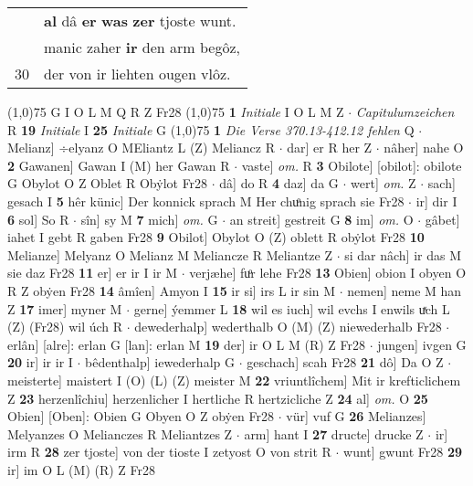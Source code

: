 \documentclass[8pt,a4paper,notitlepage]{article}
\begin{document}
\begin{table}[ht]
\begin{minipage}[t]{0.5\linewidth}
\begin{tabular}{rl}
 & \textbf{al} dâ \textbf{er} \textbf{was} \textbf{ze}\textbf{r} tjoste wunt.\\ 
 & manic zaher \textbf{ir} den arm begôz,\\ 
30 & der von ir liehten ougen vlôz.\\ 
\end{tabular}
\scriptsize
\line(1,0){75} \newline
G I O L M Q R Z Fr28 \newline
\line(1,0){75} \newline
\textbf{1} \textit{Initiale} I O L M Z   $\cdot$ \textit{Capitulumzeichen} R  \textbf{19} \textit{Initiale} I  \textbf{25} \textit{Initiale} G  \newline
\line(1,0){75} \newline
\textbf{1} \textit{Die Verse 370.13-412.12 fehlen} Q   $\cdot$ Melianz] ÷elyanz O MEliantz L (Z) Meliancz R  $\cdot$ dar] er R her Z  $\cdot$ nâher] nahe O \textbf{2} Gawanen] Gawan I (M) her Gawan R  $\cdot$ vaste] \textit{om.} R \textbf{3} Obilote] [obilot]: obilote G Obylot O Z Oblet R Obẏlot Fr28  $\cdot$ dâ] do R \textbf{4} daz] da G  $\cdot$ wert] \textit{om.} Z  $\cdot$ sach] gesach I \textbf{5} hêr künic] Der konnick sprach M Her chuͦnig sprach sie Fr28  $\cdot$ ir] dir I \textbf{6} sol] So R  $\cdot$ sîn] sy M \textbf{7} mich] \textit{om.} G  $\cdot$ an streit] gestreit G \textbf{8} im] \textit{om.} O  $\cdot$ gâbet] iahet I gebt R gaben Fr28 \textbf{9} Obilot] Obylot O (Z) oblett R obẏlot Fr28 \textbf{10} Melianze] Melyanz O Melianz M Meliancze R Meliantze Z  $\cdot$ si dar nâch] ir das M sie daz Fr28 \textbf{11} er] er ir I ir M  $\cdot$ verjæhe] fuͦr lehe Fr28 \textbf{13} Obien] obion I obyen O R Z obẏen Fr28 \textbf{14} âmîen] Amyon I \textbf{15} ir si] irs L ir sin M  $\cdot$ nemen] neme M han Z \textbf{17} imer] myner M  $\cdot$ gerne] ýemmer L \textbf{18} wil es iuch] wil evchs I enwils uͯch L (Z) (Fr28) wil úch R  $\cdot$ dewederhalp] wederthalb O (M) (Z) niewederhalb Fr28  $\cdot$ erlân] [alre]: erlan G [lan]: erlan M \textbf{19} der] ir O L M (R) Z Fr28  $\cdot$ jungen] ivgen G \textbf{20} ir] ir ir I  $\cdot$ bêdenthalp] iewederhalp G  $\cdot$ geschach] scah Fr28 \textbf{21} dô] Da O Z  $\cdot$ meisterte] maistert I (O) (L) (Z) meister M \textbf{22} vriuntlîchem] Mit ir krefticlichem Z \textbf{23} herzenlîchiu] herzenlicher I hertliche R hertzicliche Z \textbf{24} al] \textit{om.} O \textbf{25} Obien] [Oben]: Obien G Obyen O Z obẏen Fr28  $\cdot$ vür] vuf G \textbf{26} Melianzes] Melyanzes O Melianczes R Meliantzes Z  $\cdot$ arm] hant I \textbf{27} dructe] drucke Z  $\cdot$ ir] irm R \textbf{28} zer tjoste] von der tioste I zetyost O von strit R  $\cdot$ wunt] gwunt Fr28 \textbf{29} ir] im O L (M) (R) Z Fr28 \newline

\end{minipage}
\end{table}
\end{document}
